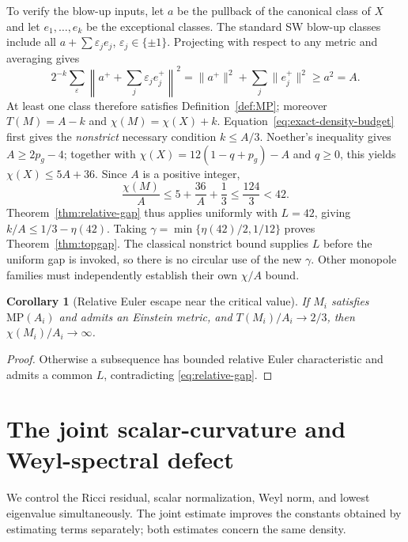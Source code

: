 \documentclass[a4paper,11pt]{article}
\numberwithin{equation}{section}
\newtheorem{corollary}[theorem]{Corollary}
\theoremstyle{definition}
\begin{document}
To verify the blow-up inputs, let $a$ be the pullback of the canonical class of $X$ and let $e_1,\ldots,e_k$ be the exceptional classes. The standard SW blow-up classes include all
$a+\sum\varepsilon_je_j$, $\varepsilon_j\in\{\pm1\}$\cite{LeBrun2001}. Projecting with respect to any metric and averaging gives
\begin{equation}\label{eq:blowup-MP}
2^{-k}\sum_{\varepsilon}\left\|a^++\sum_j\varepsilon_je_j^+\right\|^2
=\|a^+\|^2+\sum_j\|e_j^+\|^2\ge a^2=A.
\end{equation}
At least one class therefore satisfies Definition~\ref{def:MP}; moreover $T(M)=A-k$ and $\chi(M)=\chi(X)+k$.
Equation~\eqref{eq:exact-density-budget} first gives the \emph{nonstrict} necessary condition $k\le A/3$. Noether's inequality gives $A\ge2p_g-4$; together with
$\chi(X)=12(1-q+p_g)-A$ and $q\ge0$, this yields $\chi(X)\le5A+36$. Since $A$ is a positive integer,
\begin{equation}\label{eq:blowup-Euler-budget}
\frac{\chi(M)}A\le5+\frac{36}A+\frac13\le\frac{124}3<42.
\end{equation}
Theorem~\ref{thm:relative-gap} thus applies uniformly with $L=42$, giving
$k/A\le1/3-\eta(42)$. Taking
$\gamma=\min\{\eta(42)/2,1/12\}$ proves Theorem~\ref{thm:topgap}. The classical nonstrict bound supplies $L$ before the uniform gap is invoked, so there is no circular use of the new $\gamma$. Other monopole families must independently establish their own $\chi/A$ bound.

\begin{corollary}[Relative Euler escape near the critical value]\label{cor:Euler-escape}
If $M_i$ satisfies $\mathrm{MP}(A_i)$ and admits an Einstein metric, and $T(M_i)/A_i\to2/3$, then $\chi(M_i)/A_i\to\infty$.
\end{corollary}
\begin{proof}
Otherwise a subsequence has bounded relative Euler characteristic and admits a common $L$, contradicting \eqref{eq:relative-gap}.
\end{proof}

\section{The joint scalar-curvature and Weyl-spectral defect}
We control the Ricci residual, scalar normalization, Weyl norm, and lowest eigenvalue simultaneously. The joint estimate improves the constants obtained by estimating terms separately; both estimates concern the same density.
\end{document}
